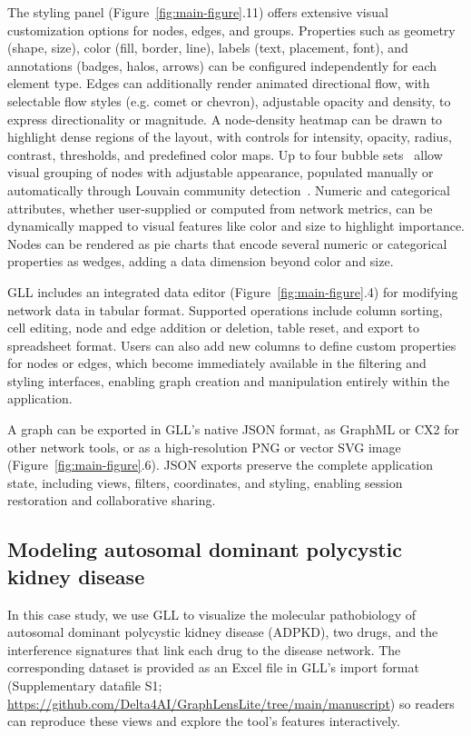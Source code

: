 The styling panel (Figure~\ref{fig:main-figure}.11) offers extensive visual customization options for nodes, edges, and groups. Properties such as geometry (shape, size), color (fill, border, line), labels (text, placement, font), and annotations (badges, halos, arrows) can be configured independently for each element type. Edges can additionally render animated directional flow, with selectable flow styles (e.g. comet or chevron), adjustable opacity and density, to express directionality or magnitude. A node-density heatmap can be drawn to highlight dense regions of the layout, with controls for intensity, opacity, radius, contrast, thresholds, and predefined color maps. Up to four bubble sets~\citep{collinsBubbleSetsRevealing2009} allow visual grouping of nodes with adjustable appearance, populated manually or automatically through Louvain community detection~\citep{blondelFastUnfoldingCommunities2008}. Numeric and categorical attributes, whether user-supplied or computed from network metrics, can be dynamically mapped to visual features like color and size to highlight importance. Nodes can be rendered as pie charts that encode several numeric or categorical properties as wedges, adding a data dimension beyond color and size.

GLL includes an integrated data editor (Figure~\ref{fig:main-figure}.4) for modifying network data in tabular format. Supported operations include column sorting, cell editing, node and edge addition or deletion, table reset, and export to spreadsheet format. Users can also add new columns to define custom properties for nodes or edges, which become immediately available in the filtering and styling interfaces, enabling graph creation and manipulation entirely within the application.

A graph can be exported in GLL's native JSON format, as GraphML or CX2 for other network tools, or as a high-resolution PNG or vector SVG image (Figure~\ref{fig:main-figure}.6). JSON exports preserve the complete application state, including views, filters, coordinates, and styling, enabling session restoration and collaborative sharing.

\subsection{Modeling autosomal dominant polycystic kidney disease}
In this case study, we use GLL to visualize the molecular pathobiology of autosomal dominant polycystic kidney disease (ADPKD), two drugs, and the interference signatures that link each drug to the disease network. The corresponding dataset is provided as an Excel file in GLL's import format (Supplementary datafile S1; \url{https://github.com/Delta4AI/GraphLensLite/tree/main/manuscript}) so readers can reproduce these views and explore the tool's features interactively.

